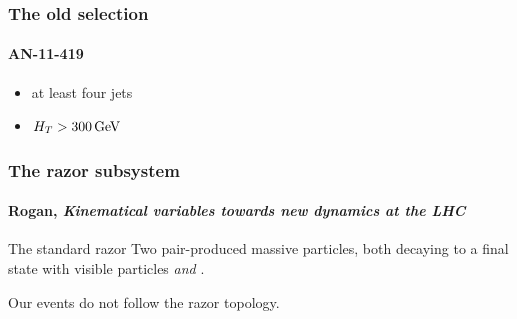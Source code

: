 \documentclass[ukenglish]{beamer}
\begin{document}
\begin{frame}
    \frametitle{The old selection}
    \framesubtitle{AN-11-419}
    \begin{itemize}
        \item at least four jets
        \item $H_T > \unit[300]{GeV}$
    \end{itemize}
\end{frame}

\begin{frame}
    \frametitle{The razor subsystem}
    \framesubtitle{Rogan, \emph{Kinematical variables towards new dynamics
    at the LHC}}
    \begin{block}{The standard razor}
        Two pair-produced massive particles, both decaying to a final state with
        visible particles \emph{and} \met.
    \end{block}
    \alert{Our events do not follow the razor topology.}

\end{frame}
\end{document}
